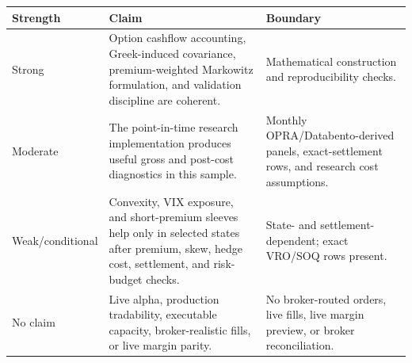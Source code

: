 \begin{tabular}{lll}
\toprule
Strength & Claim & Boundary \\
\midrule
Strong & Option cashflow accounting, Greek-induced covariance, premium-weighted Markowitz formulation, and validation discipline are coherent. & Mathematical construction and reproducibility checks. \\
Moderate & The point-in-time research implementation produces useful gross and post-cost diagnostics in this sample. & Monthly OPRA/Databento-derived panels, exact-settlement rows, and research cost assumptions. \\
Weak/conditional & Convexity, VIX exposure, and short-premium sleeves help only in selected states after premium, skew, hedge cost, settlement, and risk-budget checks. & State- and settlement-dependent; exact VRO/SOQ rows present. \\
No claim & Live alpha, production tradability, executable capacity, broker-realistic fills, or live margin parity. & No broker-routed orders, live fills, live margin preview, or broker reconciliation. \\
\bottomrule
\end{tabular}
